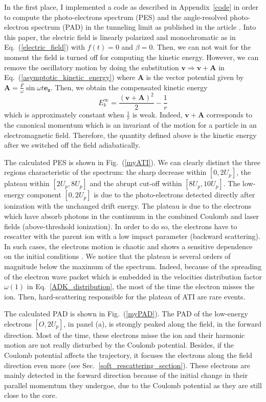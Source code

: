\documentclass[a4paper]{article}
\begin{document}
In the first place, I implemented a code as described in Appendix~\ref{code} in order to compute the photo-electrons spectrum (PES) and the angle-resolved photo-electron spectrum (PAD) in the tunneling limit as published in the article \cite{Hu_1997}. Into this paper, the electric field is linearly polarized and monochromatic as in Eq.~(\ref{electric_field}) with $f(t)=0$ and $\beta=0$. Then, we can not wait for the moment the field is turned off for computing the kinetic energy. However, we can remove the oscillatory motion by doing the substitution $\mathbf{v}\Rightarrow\mathbf{v}+\mathbf{A}$ in Eq.~(\ref{asymptotic_kinetic_energy}) where $\mathbf{A}$ is the vector potential given by $\mathbf{A}=\tfrac{F}{\omega}\sin{\omega t}\mathbf{e_{z}}$. Then, we obtain the compensated kinetic energy
\begin{equation}
E_{k}^{\infty}=\frac{(\mathbf{v}+\mathbf{A})^{2}}{2}-\frac{1}{r}
\end{equation}
which is approximately constant when $\frac{1}{r}$ is weak. Indeed, $\mathbf{v}+\mathbf{A}$ corresponds to the canonical momentum which is an invariant of the motion for a particle in an electromagnetic field. Therefore, the quantity defined above is the kinetic energy after we switched off the field adiabatically.
\par 
The calculated PES is shown in Fig.~(\ref{myATI}). We can clearly distinct the three regions characteristic of the spectrum: the sharp decrease within $[0, 2U_{p}]$, the plateau within $[2U_{p}, 8U_{p}]$ and the abrupt cut-off within $[8U_{p}, 10U_{p}]$. The low-energy component $[0, 2U_{p}]$ is due to the photo-electrons detected directly after ionization with the unchanged drift energy. The plateau is due to the electrons which have absorb photons in the continuum in the combined Coulomb and laser fields (above-threshold ionization). In order to do so, the electrons have to rescatter with the parent ion with a low impact parameter (backward scattering). In such cases, the electrons motion is chaotic and shows a sensitive dependence on the initial conditions \cite{Hu_1997}. We notice that the plateau is several orders of magnitude below the maximum of the spectrum. Indeed, because of the spreading of the electron wave packet which is embedded in the velocities distribution factor $\omega(1)$ in Eq.~\ref{ADK_distribution}, the most of the time the electron misses the ion. Then, hard-scattering responsible for the plateau of ATI are rare events.
\par
The calculated PAD is shown in Fig.~(\ref{myPAD}). The PAD of the low-energy electrons $[O, 2U_{p}]$, in panel (a), is strongly peaked along the field, in the forward direction. Most of the time, these electrons misse the ion and their harmonic motion are not really disturbed by the Coulomb potential. Besides, if the Coulomb potential affects the trajectory, it focuses the electrons along the field direction even more (see Sec.~\ref{soft_rescattering_section}). These electrons are mainly detected in the forward direction because of the initial change in their parallel momemtum they undergoe, due to the Coulomb potential as they are still close to the core. \\
\end{document}
